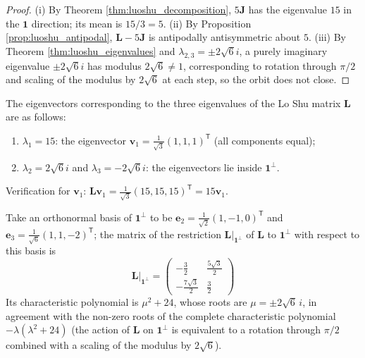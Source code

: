 \begin{proof}
(i) By Theorem \ref{thm:luoshu_decomposition}, $5\mathbf{J}$ has the eigenvalue $15$ in the $\mathbf{1}$ direction; its mean is $15/3 = 5$. (ii) By Proposition \ref{prop:luoshu_antipodal}, $\mathbf{L} - 5\mathbf{J}$ is antipodally antisymmetric about $5$. (iii) By Theorem \ref{thm:luoshu_eigenvalues} and $\lambda_{2,3} = \pm 2\sqrt{6}i$, a purely imaginary eigenvalue $\pm2\sqrt{6}i$ has modulus $2\sqrt{6}\ne1$, corresponding to rotation through $\pi/2$ and scaling of the modulus by $2\sqrt{6}$ at each step, so the orbit does not close.
\end{proof}

\begin{example}\label{ex:luoshu_spectral}
The eigenvectors corresponding to the three eigenvalues of the Lo Shu matrix $\mathbf{L}$ are as follows:
\begin{enumerate}[label=(\roman*)]
    \item $\lambda_1 = 15$: the eigenvector $\mathbf{v}_1 = \frac{1}{\sqrt{3}}(1,1,1)^{\mathsf T}$ (all components equal);
    \item $\lambda_2 = 2\sqrt{6}i$ and $\lambda_3 = -2\sqrt{6}i$: the eigenvectors lie inside $\mathbf{1}^\perp$.
\end{enumerate}
Verification for $\mathbf{v}_1$: $\mathbf{L}\mathbf{v}_1 = \frac{1}{\sqrt{3}}(15, 15, 15)^{\mathsf T} = 15\mathbf{v}_1$.

Take an orthonormal basis of $\mathbf{1}^\perp$ to be $\mathbf{e}_2 = \frac{1}{\sqrt{2}}(1, -1, 0)^{\mathsf T}$ and $\mathbf{e}_3 = \frac{1}{\sqrt{6}}(1, 1, -2)^{\mathsf T}$; the matrix of the restriction $\mathbf{L}|_{\mathbf{1}^\perp}$ of $\mathbf{L}$ to $\mathbf{1}^\perp$ with respect to this basis is
\[
\mathbf{L}|_{\mathbf{1}^\perp} = \begin{pmatrix} -\frac{3}{2} & \frac{5\sqrt{3}}{2} \\ -\frac{7\sqrt{3}}{2} & \frac{3}{2} \end{pmatrix}
\]
Its characteristic polynomial is $\mu^2 + 24$, whose roots are $\mu = \pm 2\sqrt{6}\,i$, in agreement with the non-zero roots of the complete characteristic polynomial $-\lambda(\lambda^2 + 24)$ (the action of $\mathbf{L}$ on $\mathbf{1}^\perp$ is equivalent to a rotation through $\pi/2$ combined with a scaling of the modulus by $2\sqrt{6}$).
\end{example}

